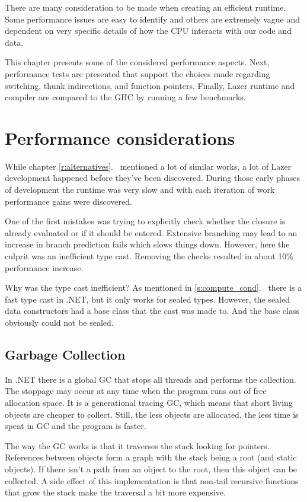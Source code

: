 \documentclass[en]{pracamgr}
\newcommand{\myref}[1]{\ref{#1}.~\textit{\nameref{#1}}}
\begin{document}
There are many consideration to be made when creating
an efficient runtime. Some performance issues are easy
to identify and others are extremely vague and dependent
on very specific details of how the CPU interacts with
our code and data.

This chapter presents some of the considered performance aspects.
Next, performance tests are presented that support the choices
made regarding switching, thunk indirections, and function pointers.
Finally, Lazer runtime and compiler are compared to the GHC by running
a few benchmarks.

\section{Performance considerations}

While chapter \myref{r:alternatives} mentioned a lot of similar
works, a lot of Lazer development happened before they've been
discovered. During those early phases of development the runtime
was very slow and with each iteration of work performance gains were
discovered.

One of the first mistakes was trying to explicitly check whether
the closure is already evaluated or if it should be entered.
Extensive branching may lead to an increase in branch
prediction fails which slows things down.
However, here the culprit was an inefficient type cast.
Removing the checks resulted in about 10\% performance increase.

Why was the type cast inefficient? As mentioned in \myref{s:compute_cond}
there is a fast type cast in .NET, but it only works for
sealed types. However, the sealed data constructors had a
base class that the cast was made to. And the base class
obviously could not be sealed.

\subsection{Garbage Collection}

In .NET there is a global GC that stops all threads
and performs the collection.
The stoppage may occur at any time when the program
runs out of free allocation space.
It is a generational tracing GC,
which means that short living objects are cheaper to collect.
Still, the less objects are allocated, the less time is
spent in GC and the program is faster.

The way the GC works is that it traverses the stack looking
for pointers. References between objects form a graph with
the stack being a root (and static objects). If there isn't a path from an object
to the root, then this object can be collected.
A side effect of this implementation is that
non-tail recursive functions that grow the stack
make the traversal a bit more expensive.
\end{document}
